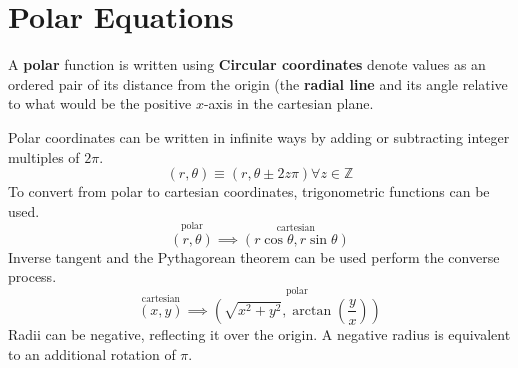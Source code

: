 \documentclass[../AP_Calculus]{subfiles}
\begin{document}
	\section{Polar Equations}
		A \textbf{polar} function is written using 
		\textbf{Circular coordinates} denote values as an ordered pair of its distance from the origin (the \textbf{radial line} and its angle relative to what would be the positive $x$-axis in the cartesian plane.
		\begin{center}
		\end{center}
		Polar coordinates can be written in infinite ways by adding or subtracting integer multiples of $2\pi$. \\
		\[(r, \theta) \equiv (r, \theta \pm 2z\pi) \forall z \in \mathbb{Z}\]
		To convert from polar to cartesian coordinates, trigonometric functions can be used.
		\[\overset{\text{polar}}{(r, \theta)} \implies \overset{\text{cartesian}}{(r\cos\theta, r\sin\theta)}\]
		Inverse tangent and the Pythagorean theorem can be used perform the converse process.
		\[\overset{\text{cartesian}}{(x, y)} \implies \overset{\text{polar}}{\left(\sqrt{x^2 + y^2}, \arctan\left(\frac{y}{x}\right)\right)}\]
		Radii can be negative, reflecting it over the origin. A negative radius is equivalent to an additional rotation of $\pi$.
		\begin{center}
		\end{center}
\end{document}
